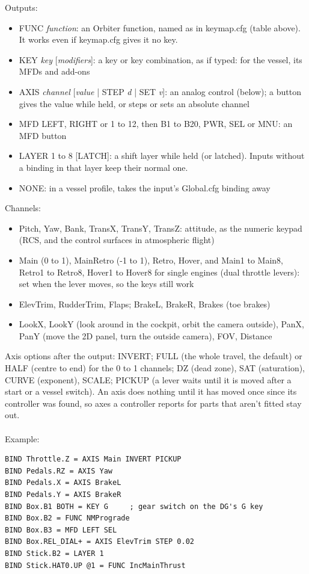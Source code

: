 \documentclass[Orbiter User Manual.tex]{subfiles}
\begin{document}
Outputs:
\begin{itemize}
\item FUNC \textit{function}: an Orbiter function, named as in keymap.cfg (table above). It works even if keymap.cfg gives it no key.
\item KEY \textit{key} [\textit{modifiers}]: a key or key combination, as if typed: for the vessel, its MFDs and add-ons
\item AXIS \textit{channel} [\textit{value} | STEP \textit{d} | SET \textit{v}]: an analog control (below); a button gives the value while held, or steps or sets an absolute channel
\item MFD LEFT, RIGHT or 1 to 12, then B1 to B20, PWR, SEL or MNU: an MFD button
\item LAYER 1 to 8 [LATCH]: a shift layer while held (or latched). Inputs without a binding in that layer keep their normal one.
\item NONE: in a vessel profile, takes the input's Global.cfg binding away
\end{itemize}
Channels:
\begin{itemize}
\item Pitch, Yaw, Bank, TransX, TransY, TransZ: attitude, as the numeric keypad (RCS, and the control surfaces in atmospheric flight)
\item Main (0 to 1), MainRetro (-1 to 1), Retro, Hover, and Main1 to Main8, Retro1 to Retro8, Hover1 to Hover8 for single engines (dual throttle levers): set when the lever moves, so the keys still work
\item ElevTrim, RudderTrim, Flaps; BrakeL, BrakeR, Brakes (toe brakes)
\item LookX, LookY (look around in the cockpit, orbit the camera outside), PanX, PanY (move the 2D panel, turn the outside camera), FOV, Distance
\end{itemize}
Axis options after the output: INVERT; FULL (the whole travel, the default) or HALF (centre to end) for the 0 to 1 channels; DZ (dead zone), SAT (saturation), CURVE (exponent), SCALE; PICKUP (a lever waits until it is moved after a start or a vessel switch). An axis does nothing until it has moved once since its controller was found, so axes a controller reports for parts that aren't fitted stay out.\\
\\
Example:
\begin{lstlisting}[language=OSFS]
BIND Throttle.Z = AXIS Main INVERT PICKUP
BIND Pedals.RZ = AXIS Yaw
BIND Pedals.X = AXIS BrakeL
BIND Pedals.Y = AXIS BrakeR
BIND Box.B1 BOTH = KEY G     ; gear switch on the DG's G key
BIND Box.B2 = FUNC NMPrograde
BIND Box.B3 = MFD LEFT SEL
BIND Box.REL_DIAL+ = AXIS ElevTrim STEP 0.02
BIND Stick.B2 = LAYER 1
BIND Stick.HAT0.UP @1 = FUNC IncMainThrust
\end{lstlisting}
\end{document}

